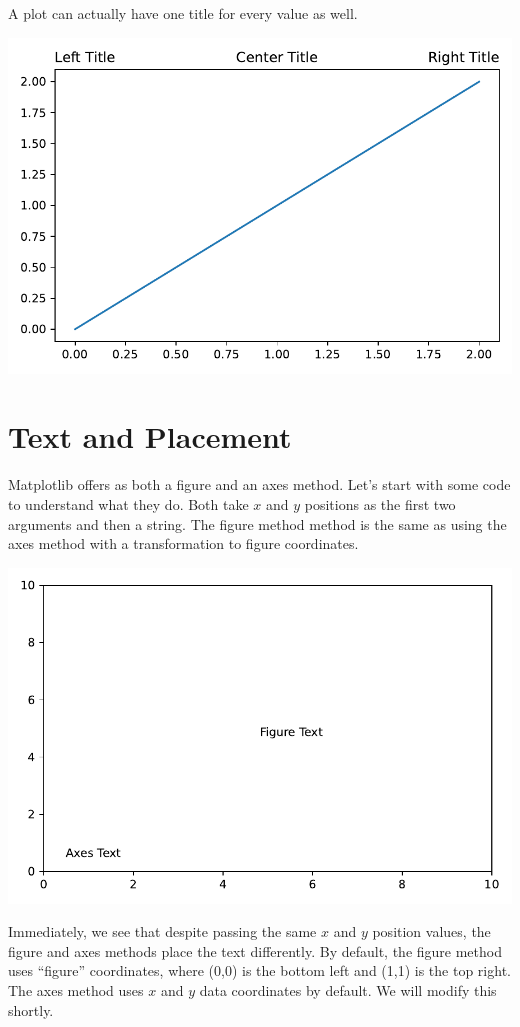 A plot can actually have one title for every  value as well. 


\begin{center}
    \includegraphics[width = .7\textwidth]{figures/proseplots/title-loc.pdf}
\end{center}


\section{Text and Placement}\label{sec:textplacement}

Matplotlib offers  as both a figure and an axes method. Let's start with some code to understand what they do. Both take $x$ and $y$ positions as the first two arguments and then a string. The figure method method is the same as using the axes method with a transformation to figure coordinates. 



\begin{center}
    \includegraphics[width = .8\textwidth]{figures/proseplots/text-methods.pdf}
\end{center}

Immediately, we see that despite passing the same $x$ and $y$ position values, the figure and axes methods place the text differently. By default, the figure method uses ``figure'' coordinates, where (0,0) is the bottom left and (1,1) is the top right. The axes method uses $x$ and $y$ data coordinates by default. We will modify this shortly. 

